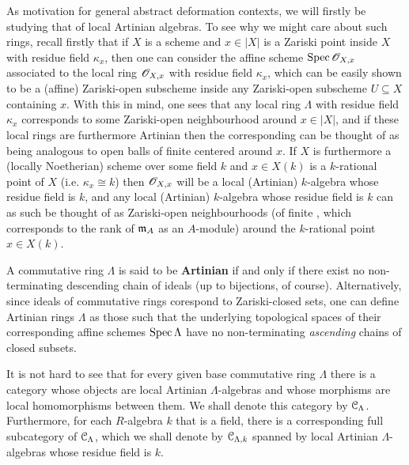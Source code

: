         As motivation for general abstract deformation contexts, we will firstly be studying that of local Artinian algebras. To see why we might care about such rings, recall firstly that if $X$ is a scheme and $x \in |X|$ is a Zariski point inside $X$ with residue field $\kappa_x$, then one can consider the affine scheme $\operatorname{Spec} \mathscr{O}_{X, x}$ associated to the local ring $\mathscr{O}_{X, x}$ with residue field $\kappa_x$, which can be easily shown to be a (affine) Zariski-open subscheme inside any Zariski-open subscheme $U \subseteq X$ containing $x$. With this in mind, one sees that any local ring $\Lambda$ with residue field $\kappa_x$ corresponds to some  Zariski-open neighbourhood around $x \in |X|$, and if these local rings are furthermore Artinian then the corresponding  can be thought of as being analogous to open balls of finite  centered around $x$. If $X$ is furthermore a (locally Noetherian) scheme over some field $k$ and $x \in X(k)$ is a $k$-rational point of $X$ (i.e. $\kappa_x \cong k$) then $\mathscr{O}_{X, x}$ will be a local (Artinian) $k$-algebra whose residue field is $k$, and any local (Artinian) $k$-algebra whose residue field is $k$ can as such be thought of as  Zariski-open neighbourhoods (of finite , which corresponds to the rank of $\mathfrak{m}_A$ as an $A$-module) around the $k$-rational point $x \in X(k)$. 
        \begin{definition} \label{def: artinian_rings} 
            A commutative ring $\Lambda$ is said to be \textbf{Artinian} if and only if there exist no non-terminating descending chain of ideals (up to bijections, of course). Alternatively, since ideals of commutative rings corespond to Zariski-closed sets, one can define Artinian rings $\Lambda$ as those such that the underlying topological spaces of their corresponding affine schemes $\operatorname{Spec} \Lambda$ have no non-terminating \textit{ascending} chains of closed subsets. 
            
            It is not hard to see that for every given base commutative ring $\Lambda$ there is a category whose objects are local Artinian $\Lambda$-algebras and whose morphisms are local homomorphisms between them. We shall denote this category by $\mathcal{C}_{\Lambda}$. Furthermore, for each $R$-algebra $k$ that is a field, there is a corresponding full subcategory of $\mathcal{C}_{\Lambda}$, which we shall denote by $\mathcal{C}_{\Lambda, k}$ spanned by local Artinian $\Lambda$-algebras whose residue field is $k$. 
        \end{definition}
        
